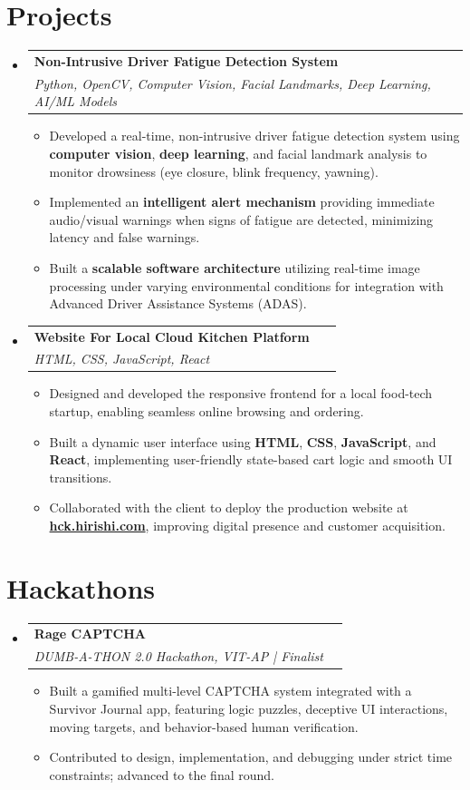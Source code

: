 \documentclass[a4paper,10pt]{article}
\makeatletter
\newcommand{\resumeProject}[4]{
\vspace{0.3mm}\item
    \begin{tabular*}{0.98\textwidth}[t]{l@{\extracolsep{\fill}}r}
        \textbf{#1} & \textit{\footnotesize{#3}} \\
        \footnotesize{\textit{#2}} & \footnotesize{#4}
    \end{tabular*}
    \vspace{-3.5mm}
}
\newcommand{\resumeSubHeadingListStart}{\begin{itemize}[leftmargin=*,labelsep=0mm,itemsep=1pt]}
\newcommand{\resumeItemListStart}{\begin{justify}\begin{itemize}[leftmargin=3ex, rightmargin=2ex, noitemsep,labelsep=1.2mm,itemsep=0mm]\small}
\newcommand{\resumeSubHeadingListEnd}{\end{itemize}\vspace{1mm}}
\newcommand{\resumeItemListEnd}{\end{itemize}\end{justify}\vspace{-1.5mm}}
\makeatother
\begin{document}
\section{Projects}
\resumeSubHeadingListStart
    \resumeProject
      {Non-Intrusive Driver Fatigue Detection System \ \href{https://github.com/munni036/drowsiness_detection}{\faGithub}}
      {Python, OpenCV, Computer Vision, Facial Landmarks, Deep Learning, AI/ML Models}
      {}
      {}
      \resumeItemListStart
        \item {Developed a real-time, non-intrusive driver fatigue detection system using \textbf{computer vision}, \textbf{deep learning}, and facial landmark analysis to monitor drowsiness (eye closure, blink frequency, yawning).}
        \item {Implemented an \textbf{intelligent alert mechanism} providing immediate audio/visual warnings when signs of fatigue are detected, minimizing latency and false warnings.}
        \item {Built a \textbf{scalable software architecture} utilizing real-time image processing under varying environmental conditions for integration with Advanced Driver Assistance Systems (ADAS).}
      \resumeItemListEnd
    \resumeProject
      {Website For Local Cloud Kitchen Platform\ \href{https://hck.hirishi.com}{\faExternalLink*}}
      {HTML, CSS, JavaScript, React}
      {}
      {}
      \resumeItemListStart
        \item {Designed and developed the responsive frontend for a local food-tech startup, enabling seamless online browsing and ordering.}
        \item {Built a dynamic user interface using \textbf{HTML}, \textbf{CSS}, \textbf{JavaScript}, and \textbf{React}, implementing user-friendly state-based cart logic and smooth UI transitions.}
        \item {Collaborated with the client to deploy the production website at \href{https://hck.hirishi.com}{\textbf{hck.hirishi.com}}, improving digital presence and customer acquisition.}
      \resumeItemListEnd
\resumeSubHeadingListEnd

\section{Hackathons}
\resumeSubHeadingListStart
    \resumeProject
      {Rage CAPTCHA \ \href{https://github.com/munni036/dumbathon-journal}{\faGithub}}
      {DUMB-A-THON 2.0 Hackathon, VIT-AP | Finalist}
      {}
      {}
      \resumeItemListStart
        \item {Built a gamified multi-level CAPTCHA system integrated with a Survivor Journal app, featuring logic puzzles, deceptive UI interactions, moving targets, and behavior-based human verification.}
        \item {Contributed to design, implementation, and debugging under strict time constraints; advanced to the final round.}
      \resumeItemListEnd
\resumeSubHeadingListEnd
\end{document}
